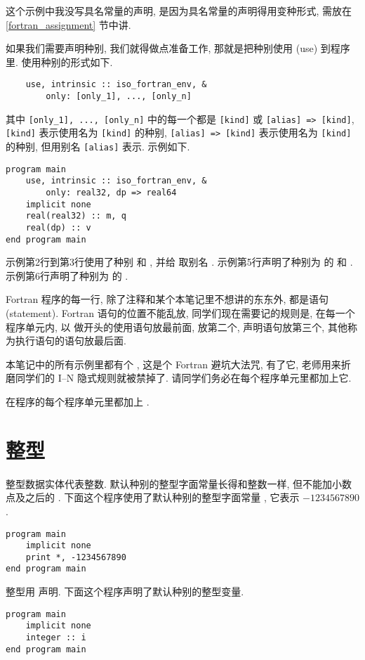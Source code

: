 这个示例中我没写具名常量的声明, 是因为具名常量的声明得用变种形式, 需放在 \ref{fortran_assignment} 节中讲.

如果我们需要声明种别, 我们就得做点准备工作, 那就是把种别使用 (use) 到程序里. 使用种别的形式如下.
\begin{lstlisting}
    use, intrinsic :: iso_fortran_env, &
        only: [only_1], ..., [only_n]
\end{lstlisting}
其中 \texttt{[only\_{}1], ..., [only\_{}n]} 中的每一个都是 \texttt{[kind]} 或 \texttt{[alias] => [kind]}, \texttt{[kind]} 表示使用名为 \texttt{[kind]} 的种别, \texttt{[alias] => [kind]} 表示使用名为 \texttt{[kind]} 的种别, 但用别名 \texttt{[alias]} 表示. 示例如下.
\begin{lstlisting}
program main
    use, intrinsic :: iso_fortran_env, &
        only: real32, dp => real64
    implicit none
    real(real32) :: m, q
    real(dp) :: v
end program main
\end{lstlisting}
示例第2行到第3行使用了种别  和 , 并给  取别名 . 示例第5行声明了种别为  的  和 . 示例第6行声明了种别为  的 .

Fortran 程序的每一行, 除了注释和某个本笔记里不想讲的东东外, 都是语句 (statement). Fortran 语句的位置不能乱放, 同学们现在需要记的规则是, 在每一个程序单元内, 以  做开头的使用语句放最前面,  放第二个, 声明语句放第三个, 其他称为执行语句的语句放最后面.

本笔记中的所有示例里都有个 , 这是个 Fortran 避坑大法咒, 有了它, 老师用来折磨同学们的 I--N 隐式规则就被禁掉了. 请同学们务必在每个程序单元里都加上它.
\begin{convention}
    在程序的每个程序单元里都加上 .
\end{convention}

\section{整型}

整型数据实体代表整数. 默认种别的整型字面常量长得和整数一样, 但不能加小数点及之后的 . 下面这个程序使用了默认种别的整型字面常量 , 它表示 $-1234567890$.
\begin{lstlisting}
program main
    implicit none
    print *, -1234567890
end program main
\end{lstlisting}

整型用  声明. 下面这个程序声明了默认种别的整型变量.
\begin{lstlisting}
program main
    implicit none
    integer :: i
end program main
\end{lstlisting}

